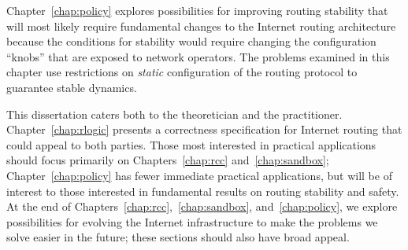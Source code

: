 Chapter~\ref{chap:policy} explores possibilities for improving routing
stability that will most likely require fundamental changes to the
Internet routing architecture because the conditions for stability would
require changing the configuration ``knobs'' that are exposed to network
operators.  The problems examined in this chapter use restrictions on
{\em static} configuration of the routing protocol to guarantee stable
dynamics.  

This dissertation caters both to the theoretician and the practitioner.
Chapter~\ref{chap:rlogic} presents a correctness specification for
Internet routing that could appeal to both parties.  Those most interested in
practical applications should focus primarily on Chapters~\ref{chap:rcc}
and~\ref{chap:sandbox}; Chapter~\ref{chap:policy} has fewer immediate
practical applications, but will be of interest to those interested in
fundamental results on routing stability and safety.  At the end of
Chapters~\ref{chap:rcc},~\ref{chap:sandbox}, and~\ref{chap:policy}, we
explore possibilities for 
evolving the Internet infrastructure to make the problems we solve
easier in the future; these sections should also have broad appeal.

